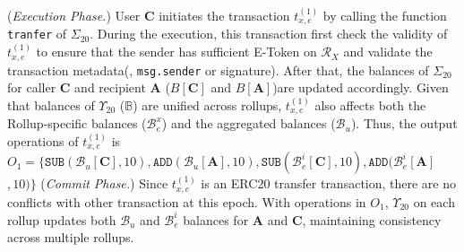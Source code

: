 (\emph{Execution Phase.}) User \textbf{C} initiates the transaction $t^{(1)}_{x,e}$ by calling the function \texttt{tranfer} of $\Sigma_{20}$. During the execution, this transaction first check the validity of $t^{(1)}_{x,e}$ to ensure that the sender has sufficient E-Token on $\mathcal{R}_X$ and validate the transaction metadata(\ie, \texttt{msg.sender} or signature).
After that, the balances of $\Sigma_{20}$ for caller \textbf{C} and recipient \textbf{A} ($B[\mathbf{C}]$ and $B[\mathbf{A}]$)are updated accordingly.
Given that balances of $\Upsilon_{20}$ ($\mathbb{B}$) are unified across rollups, $t^{(1)}_{x,e}$ also affects both the Rollup-specific balances ($\mathcal{B}^x_e$) and the aggregated balances ($\mathcal{B}_u$). 
Thus, the output operations of $t^{(1)}_{x,e}$ is 
$O_1=\{\mathtt{SUB}(\mathcal{B}_u[\mathbf{C}],10), \mathtt{ADD}(\mathcal{B}_u[\mathbf{A}],10),\mathtt{SUB}(\mathcal{B}^i_e[\mathbf{C}],10),\mathtt{ADD}(\mathcal{B}^i_e[\mathbf{A}]$
$,10)\}$
(\emph{Commit Phase.}) Since $t^{(1)}_{x,e}$ is an ERC20 transfer transaction, there are no conflicts with other transaction at this epoch. With operations in $O_1$, $\Upsilon_{20}$ on each rollup updates both $\mathcal{B}_u$ and $\mathcal{B}^i_e$ balances for \textbf{A} and \textbf{C}, maintaining consistency across multiple rollups.



